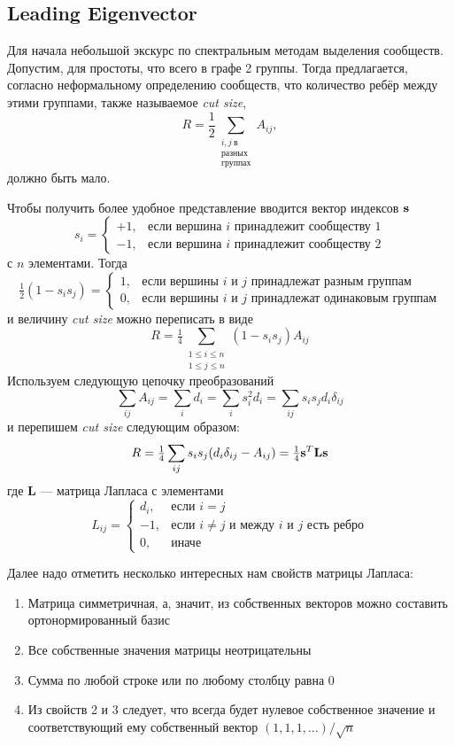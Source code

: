 \documentclass[12pt]{article}
\begin{document}


\subsection{Leading Eigenvector}

Для начала небольшой экскурс по спектральным методам выделения сообществ. Допустим, для простоты, что всего в графе 2 группы. Тогда предлагается, согласно неформальному определению сообществ, что количество ребёр между этими группами, также называемое \textit{cut size},
\[
R = \frac{1}{2}\sum\limits_{\substack{i, j\ \text{в} \\ \text{разных} \\ \text{группах}}} A_{ij},
\]
должно быть мало.

Чтобы получить более удобное представление вводится вектор индексов $\bold s$ 
\[
s_i = 
\begin{cases}
+1, & \text{если вершина } i \text{ принадлежит сообществу 1} \\
-1, & \text{если вершина } i \text{ принадлежит сообществу 2}
\end{cases}
\]
с $n$ элементами.
Тогда
\[
\tfrac{1}{2}(1 - s_is_j) = 
\begin{cases}
1, & \text{если вершины } i \text{ и } j \text{ принадлежат разным группам} \\
0, & \text{если вершины } i \text{ и } j \text{ принадлежат одинаковым группам}
\end{cases}
\]
и величину \textit{cut size} можно переписать в виде
\[
R = \tfrac{1}{4}\sum\limits_{\substack{1 \leq i \leq n \\ 1 \leq j \leq n}}(1 - s_is_j)A_{ij}
\]
Используем следующую цепочку преобразований
\[
\sum\limits_{ij}A_{ij} = \sum\limits_{i}d_i = \sum\limits_{i}s_i^2d_i = \sum\limits_{ij}s_is_jd_i\delta_{ij}
\]
и перепишем \textit{cut size} следующим образом:
\[
R = \tfrac{1}{4}\sum\limits_{ij}s_is_j(d_i\delta_{ij} - A_{ij}) = \tfrac{1}{4}{\bold s}^T\textbf{Ls}
\]
где \textbf{L} --- матрица Лапласа с элементами
\[
L_{ij} = 
\begin{cases}
d_i, & \text{если } i = j \\
-1, & \text{если } i \neq j \text{ и между } i \text{ и } j \text{ есть ребро} \\
0, & \text{иначе}
\end{cases}
\]

Далее надо отметить несколько интересных нам свойств матрицы Лапласа:
\begin{enumerate}
\item Матрица симметричная, а, значит, из собственных векторов можно составить ортонормированный базис
\item Все собственные значения матрицы неотрицательны
\item Сумма по любой строке или по любому столбцу равна 0
\item Из свойств 2 и 3 следует, что всегда будет нулевое собственное значение и соответствующий ему собственный вектор $(1, 1, 1, \dots) / \sqrt{n}$
\end{enumerate}
\end{document}
